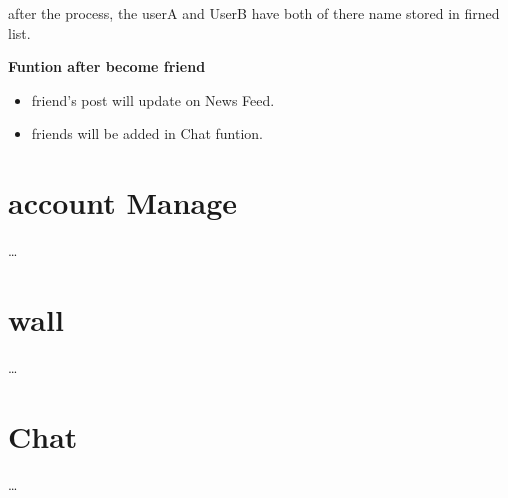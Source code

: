 after the process, the userA and UserB have both of there name stored in firned
list.

\textbf{Funtion after become friend}
\begin{itemize}
\item friend's post will update on News Feed.
\item friends will be added in Chat funtion.
\end{itemize}

\section{account Manage}
\ldots

\section{wall}
\ldots

\section{Chat}
\ldots
